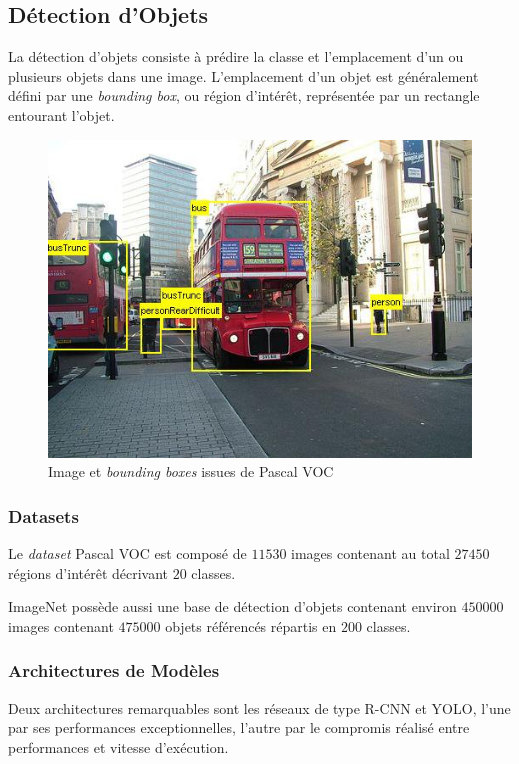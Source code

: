 \documentclass[a4paper, 11pt]{report}
\begin{document}
\subsection{Détection d'Objets}
La détection d'objets consiste à prédire la classe et l'emplacement d'un ou plusieurs objets dans une image. L'emplacement d'un objet est généralement défini par une \emph{bounding box}, ou région d'intérêt, représentée par un rectangle entourant l'objet.
\begin{figure}[H]
	\begin{center}
		\includegraphics[scale=0.40625]{Images/Pascal_VOC_Detection.jpg}
		\caption{Image et \emph{bounding boxes} issues de Pascal VOC}
	\end{center}
\end{figure}

\subsubsection{Datasets}
Le \emph{dataset} Pascal VOC est composé de $11530$ images contenant au total $27450$ régions d'intérêt décrivant $20$ classes.

ImageNet possède aussi une base de détection d'objets contenant environ $450000$ images contenant $475000$ objets référencés répartis en $200$ classes.
\subsubsection{Architectures de Modèles}
Deux architectures remarquables sont les réseaux de type R-CNN et YOLO, l'une par ses performances exceptionnelles, l'autre par le compromis réalisé entre performances et vitesse d’exécution.
\end{document}

